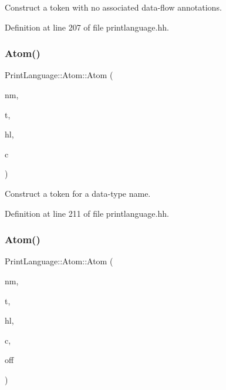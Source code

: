 Construct a token with no associated data-\/flow annotations. 



Definition at line 207 of file printlanguage.\+hh.

\mbox{\label{struct_print_language_1_1_atom_acc7729810a5204cedb14d7d528e2d16a}} 
\subsubsection{\texorpdfstring{Atom()}{Atom()}\hspace{0.1cm}{\footnotesize\ttfamily [2/6]}}
{\footnotesize\ttfamily Print\+Language\+::\+Atom\+::\+Atom (\begin{DoxyParamCaption}\item[{const string \&}]{nm,  }\item[{\mbox{\hyperlink{class_print_language_a7102f70f47777d8b17af52c5157c473e}{tagtype}}}]{t,  }\item[{\mbox{\hyperlink{class_emit_xml_a7c3577436da429c3c75f4b82cac6864f}{Emit\+Xml\+::syntax\+\_\+highlight}}}]{hl,  }\item[{const \mbox{\hyperlink{class_datatype}{Datatype}} $\ast$}]{c }\end{DoxyParamCaption})\hspace{0.3cm}{\ttfamily [inline]}}



Construct a token for a data-\/type name. 



Definition at line 211 of file printlanguage.\+hh.

\mbox{\label{struct_print_language_1_1_atom_aac8870447a41bff5f9129e27fc475258}} 
\subsubsection{\texorpdfstring{Atom()}{Atom()}\hspace{0.1cm}{\footnotesize\ttfamily [3/6]}}
{\footnotesize\ttfamily Print\+Language\+::\+Atom\+::\+Atom (\begin{DoxyParamCaption}\item[{const string \&}]{nm,  }\item[{\mbox{\hyperlink{class_print_language_a7102f70f47777d8b17af52c5157c473e}{tagtype}}}]{t,  }\item[{\mbox{\hyperlink{class_emit_xml_a7c3577436da429c3c75f4b82cac6864f}{Emit\+Xml\+::syntax\+\_\+highlight}}}]{hl,  }\item[{const \mbox{\hyperlink{class_datatype}{Datatype}} $\ast$}]{c,  }\item[{int4}]{off }\end{DoxyParamCaption})\hspace{0.3cm}{\ttfamily [inline]}}



